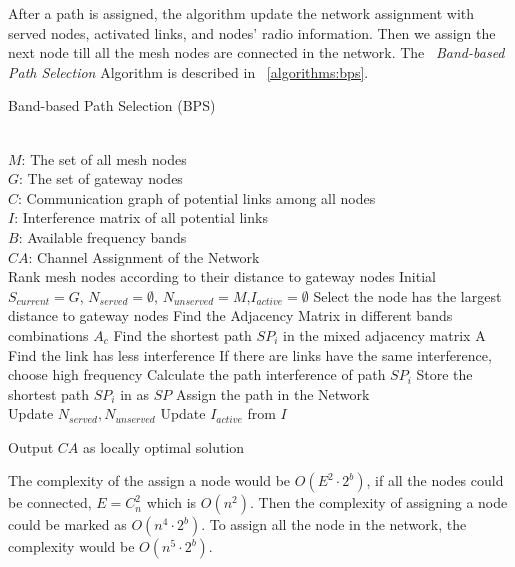 After a path is assigned, the algorithm update the network assignment with served nodes, activated links, and nodes' radio information. Then we assign the next node till all the mesh nodes are connected in the network.
The ~\emph{Band-based Path Selection} Algorithm is described in ~\ref{algorithms:bps}.

\begin{algorithm}
    \small
\caption{Band-based Path Selection (BPS)}
\label{algorithms:bps}
\begin{algorithmic}[1]
\REQUIRE  ~~\\
	$M$: The set of all mesh nodes\\
	$G$: The set of gateway nodes\\
	$C$: Communication graph of potential links among all nodes\\
	$I$: Interference matrix of all potential links \\
	$B$: Available frequency bands
\ENSURE ~~\\    
$CA$: Channel Assignment of the Network\\
\STATE Rank mesh nodes according to their distance to gateway nodes
\STATE Initial $S_{current}=G$, $N_{served}=\emptyset$, $N_{unserved}=M$,$I_{active}=\emptyset$
\STATE Select the node has the largest distance to gateway nodes
\STATE Find the Adjacency Matrix in different bands combinations $A_c$
\STATE Find the shortest path $SP_i$ in the mixed adjacency matrix A 
\STATE Find the link has less interference
\STATE If there are links have the same interference, choose high frequency
\STATE Calculate the path interference of path $SP_i$
\ENDFOR
\STATE Store the shortest path $SP_i$ in as $SP$
\ENDFOR
\STATE Assign the path in the Network\\
		\STATE Update $N_{served},N_{unserved}$
		\STATE Update $I_{active}$ from $I$
\ENDWHILE 

Output $CA$ as locally optimal solution\\
\end{algorithmic}
\end{algorithm}

The complexity of the assign a node would be $O(E^2\cdot2^b)$, if all the nodes could be connected, $E=C_n^2$ which is $O(n^2)$.
Then the complexity of assigning a node could be marked as $O(n^4\cdot2^b)$.
 To assign all the node in the network, the complexity would be $O(n^5\cdot2^b)$.


